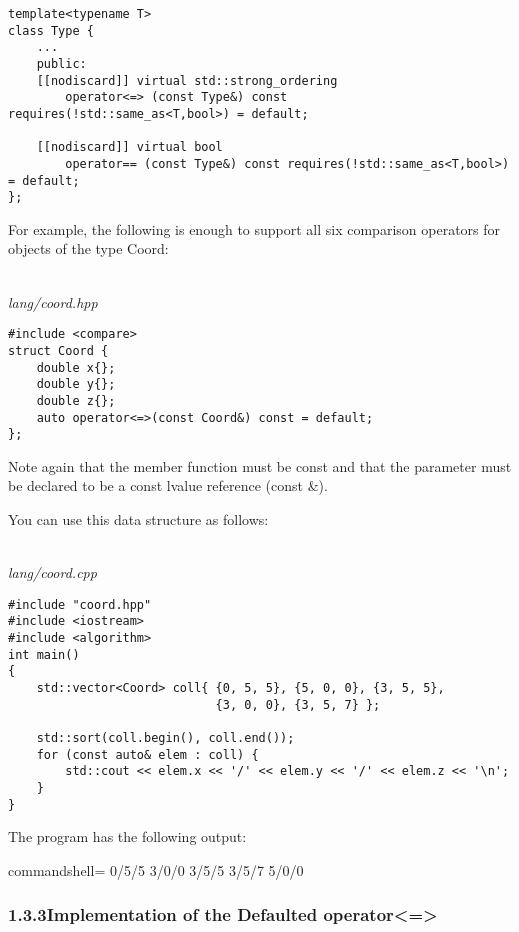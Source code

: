 \begin{lstlisting}[style=styleCXX]
template<typename T>
class Type {
	...
	public:
	[[nodiscard]] virtual std::strong_ordering
		operator<=> (const Type&) const requires(!std::same_as<T,bool>) = default;
	
	[[nodiscard]] virtual bool
		operator== (const Type&) const requires(!std::same_as<T,bool>) = default;
};
\end{lstlisting}

For example, the following is enough to support all six comparison operators for objects of the type Coord:

\noindent
\hspace*{\fill} \\ %
\textit{lang/coord.hpp}

\begin{lstlisting}[style=styleCXX]
#include <compare>
struct Coord {
	double x{};
	double y{};
	double z{};
	auto operator<=>(const Coord&) const = default;
};
\end{lstlisting}

Note again that the member function must be const and that the parameter must be declared to be a const lvalue reference (const \&).

You can use this data structure as follows:

\noindent
\hspace*{\fill} \\ %
\textit{lang/coord.cpp}

\begin{lstlisting}[style=styleCXX]
#include "coord.hpp"
#include <iostream>
#include <algorithm>
int main()
{
	std::vector<Coord> coll{ {0, 5, 5}, {5, 0, 0}, {3, 5, 5},
							 {3, 0, 0}, {3, 5, 7} };
							 
	std::sort(coll.begin(), coll.end());
	for (const auto& elem : coll) {
		std::cout << elem.x << '/' << elem.y << '/' << elem.z << '\n';
	}
}
\end{lstlisting}

The program has the following output:

\begin{tcblisting}{commandshell={}}
0/5/5
3/0/0
3/5/5
3/5/7
5/0/0
\end{tcblisting}

\subsubsection*{ 1.3.3\hspace{0.2cm}Implementation of the Defaulted operator<=>}

